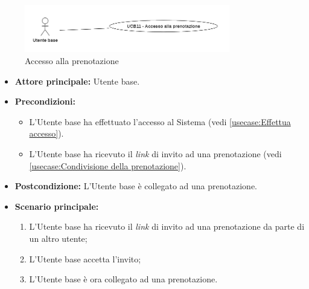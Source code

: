 \newpage
{}
\label{usecase:Accesso alla prenotazione}

\begin{figure}[h]
	\centering
	\includegraphics[width=0.8\textwidth]{./uml/UCB11.png} 
	\caption{Accesso alla prenotazione}
	\label{fig:UCB11}
  \end{figure}

\begin{itemize}
	\item \textbf{Attore principale:} Utente base.

	\item \textbf{Precondizioni:} 
	\begin{itemize}
		\item L'Utente base ha effettuato l'accesso al Sistema (vedi \autoref{usecase:Effettua accesso}).
		\item L'Utente base ha ricevuto il \textit{link} di invito ad una prenotazione (vedi \autoref{usecase:Condivisione della prenotazione}).
	\end{itemize}
		

	\item \textbf{Postcondizione:} L'Utente base è collegato ad una prenotazione.

	\item \textbf{Scenario principale:}
	      \begin{enumerate}
		      \item L'Utente base ha ricevuto il \textit{link} di invito ad una prenotazione da parte di un altro utente;
		      \item L'Utente base accetta l'invito;
		      \item L'Utente base è ora collegato ad una prenotazione.
	      \end{enumerate}
\end{itemize}
